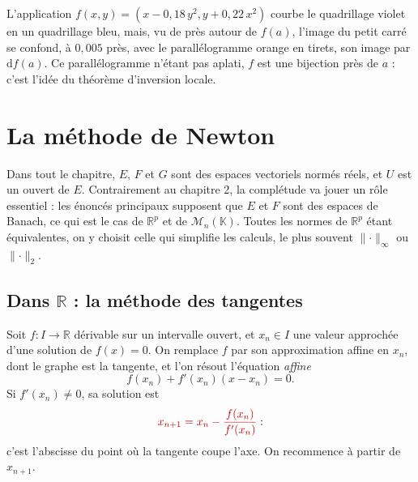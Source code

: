\documentclass[a4paper,twoside]{report}
\newcommand{\rmath}[1]{\textcolor{rougecours}{#1}}
\newcommand{\R}{\mathbb{R}}
\newcommand{\K}{\mathbb{K}}                       %
\newcommand{\dd}{\mathrm{d}}                      %
\newcommand{\Mn}[1]{\mathcal{M}_{#1}(\K)}          %
\newcommand{\norme}[1]{\lVert #1 \rVert}         %
\begin{document}
\noindent L'application $f(x, y) = (x - 0{,}18\,y^{2}, y + 0{,}22\,x^{2})$ courbe le quadrillage violet en un quadrillage bleu, mais, vu de près autour de $f(a)$, l'image du petit carré se confond, à $0{,}005$ près, avec le parallélogramme orange en tirets, son image par $\dd f(a)$. Ce parallélogramme n'étant pas aplati, $f$ est une bijection près de $a$ : c'est l'idée du théorème d'inversion locale.
\vfill
\newpage
\section[La méthode de Newton]{La méthode de Newton}

Dans tout le chapitre, $E$, $F$ et $G$ sont des espaces vectoriels normés réels, et $U$ est un ouvert de $E$. Contrairement au chapitre 2, la complétude va jouer un rôle essentiel : les énoncés principaux supposent que $E$ et $F$ sont des espaces de Banach, ce qui est le cas de $\R^{p}$ et de $\Mn{n}$. Toutes les normes de $\R^{p}$ étant équivalentes, on y choisit celle qui simplifie les calculs, le plus souvent $\norme{\cdot}_{\infty}$ ou $\norme{\cdot}_{2}$.

\subsection{Dans \texorpdfstring{$\R$}{R} : la méthode des tangentes}

Soit $f : I \to \R$ dérivable sur un intervalle ouvert, et $x_{n} \in I$ une valeur approchée d'une solution de $f(x) = 0$. On remplace $f$ par son approximation affine en $x_{n}$, dont le graphe est la tangente, et l'on résout l'équation \emph{affine}
\[ f(x_{n}) + f'(x_{n})(x - x_{n}) = 0. \]
Si $f'(x_{n}) \neq 0$, sa solution est
\[ \rmath{x_{n + 1} = x_{n} - \frac{f(x_{n})}{f'(x_{n})}} : \]
c'est l'abscisse du point où la tangente coupe l'axe. On recommence à partir de $x_{n + 1}$.
\end{document}
